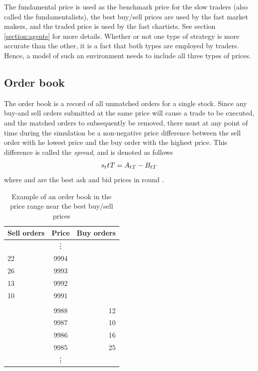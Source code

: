The fundamental price is used as the benchmark price for the slow traders (also called the fundamentalists), the best buy/sell prices are used by the fast market makers, and the traded price is used by the fast chartists. See section \ref{section:agents} for more details. Whether or not one type of strategy is more accurate than the other, it is a fact that both types are employed by traders. Hence, a model of such an environment needs to include all three types of prices.



\subsection{Order book}
The order book is a record of all unmatched orders for a single stock. Since any buy-and sell orders submitted at the same price will cause a trade to be executed, and the matched orders to subsequently be removed, there must at any point of time during the simulation be a non-negative price difference between the sell order with he lowest price and the buy order with the highest price. This difference is called the \textit{spread}, and is denoted as follows
\begin{equation}\label{equation:spread_definition}
s_{t_{} }{t_{}{T}} = A_{t_{}{T}} - B_{t_{}{T}}
\end{equation}
where  and  are the best ask and bid prices in round .

\begin{table}
\centering
\begin{tabular}{l|c|r}
Sell orders & Price & Buy orders\\
\midrule
& \vdots & \\
22 & 9994 &\\
26 & 9993 &\\
13 & 9992 &\\
10 & 9991 &\\ 
{}&{}&{}\\
& 9988& 12\\
& 9987& 10\\
& 9986& 16\\
& 9985& 25\\
& \vdots &\\
\end{tabular}
\caption{Example of an order book in the price range near the best buy/sell prices}
\label{table:orderbook_example}
\end{table}



